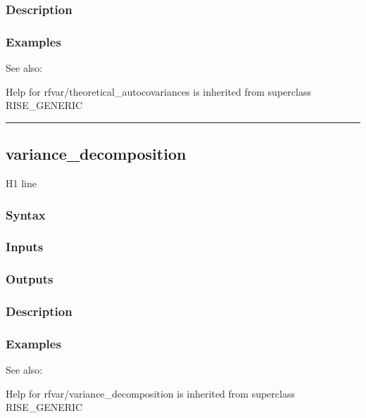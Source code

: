 \documentclass[letterpaper,10pt,english]{sphinxmanual}
\begin{document}
\subsubsection{Description}
\label{classes/models/@rfvar/rfvar:id161}

\subsubsection{Examples}
\label{classes/models/@rfvar/rfvar:id162}
See also:

Help for rfvar/theoretical\_autocovariances is inherited from superclass RISE\_GENERIC


\bigskip\hrule{}\bigskip



\subsection{variance\_decomposition}
\label{classes/models/@rfvar/rfvar:id163}\label{classes/models/@rfvar/rfvar:variance-decomposition}
H1 line


\subsubsection{Syntax}
\label{classes/models/@rfvar/rfvar:id164}

\subsubsection{Inputs}
\label{classes/models/@rfvar/rfvar:id165}

\subsubsection{Outputs}
\label{classes/models/@rfvar/rfvar:id166}

\subsubsection{Description}
\label{classes/models/@rfvar/rfvar:id167}

\subsubsection{Examples}
\label{classes/models/@rfvar/rfvar:id168}
See also:

Help for rfvar/variance\_decomposition is inherited from superclass RISE\_GENERIC
\end{document}

